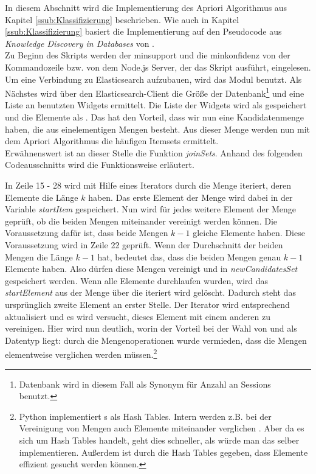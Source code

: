 In diesem Abschnitt wird die Implementierung des Apriori Algorithmus aus Kapitel \ref{ssub:Klassifizierung} beschrieben. Wie auch in Kapitel \ref{ssub:Klassifizierung} basiert die Implementierung auf den Pseudocode aus \glqq \textit{Knowledge Discovery in Databases}\grqq{} von \citet{EsSa00}.\\
Zu Beginn des Skripts werden der minsupport und die minkonfidenz von der Kommandozeile bzw. von dem Node.js Server, der das Skript ausführt, eingelesen. Um eine Verbindung zu Elasticsearch aufzubauen, wird das Modul  benutzt. Als Nächstes wird über den Elasticsearch-Client die Größe der Datenbank\footnote{Datenbank wird in diesem Fall als Synonym für Anzahl an Sessions benutzt.} und eine Liste an benutzten Widgets ermittelt. Die Liste der Widgets wird als  gespeichert und die Elemente als . Das hat den Vorteil, dass wir nun eine Kandidatenmenge haben, die aus einelementigen Mengen besteht. Aus dieser Menge werden nun mit dem Apriori Algorithmus die häufigen Itemsets ermittelt.\\
Erwähnenswert ist an dieser Stelle die Funktion \textit{joinSets}. Anhand des folgenden Codeausschnitts wird die Funktionsweise erläutert.
\clearpage
\begin{figure}[htb]

\end{figure}
In Zeile 15 - 28 wird mit Hilfe eines Iterators durch die Menge iteriert, deren Elemente die Länge $k$ haben. Das erste Element der Menge wird dabei in der Variable \textit{startItem} gespeichert. Nun wird für jedes weitere Element der Menge geprüft, ob die beiden Mengen miteinander vereinigt werden können. Die Voraussetzung dafür ist, dass beide Mengen $k-1$ gleiche Elemente haben. Diese Voraussetzung wird in Zeile 22 geprüft. Wenn der Durchschnitt der beiden Mengen die Länge $k-1$ hat, bedeutet das, dass die beiden Mengen genau $k-1$ Elemente haben. Also dürfen diese Mengen vereinigt und in \textit{newCandidatesSet} gespeichert werden. Wenn alle Elemente durchlaufen wurden, wird das \textit{startElement} aus der Menge über die iteriert wird gelöscht. Dadurch steht das ursprünglich zweite Element an erster Stelle. Der Iterator wird entsprechend aktualisiert und es wird versucht, dieses Element mit einem anderen zu vereinigen. Hier wird nun deutlich, worin der Vorteil bei der Wahl von  und  als Datentyp liegt: durch die Mengenoperationen wurde vermieden, dass die Mengen elementweise verglichen werden müssen.\footnote{Python implementiert s als Hash Tables. Intern werden z.B. bei der Vereinigung von Mengen auch Elemente miteinander verglichen \citep{GeFoGe20}. Aber da es sich um Hash Tables handelt, geht dies schneller, als würde man das selber implementieren. Außerdem ist durch die Hash Tables gegeben, dass Elemente effizient gesucht werden können.}\\
